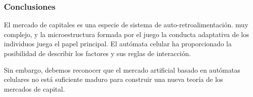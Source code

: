 \documentclass[hyperref={pdfpagelabels=false}]{beamer}
\begin{document}
\begin{frame}
\frametitle{Conclusiones}

El mercado de capitales es una especie de sistema de auto-retroalimentación. 
muy complejo, y la microestructura formada por el juego la conducta adaptativa de los individuos juega el papel principal. El autómata celular ha proporcionado la posibilidad de describir los factores y sus reglas de interacción. 

Sin embargo, debemos reconocer que el mercado artificial basado en autómatas celulares no está suficiente maduro para construir una nueva teoría de los mercados de capital.

\end{frame}
\end{document}
